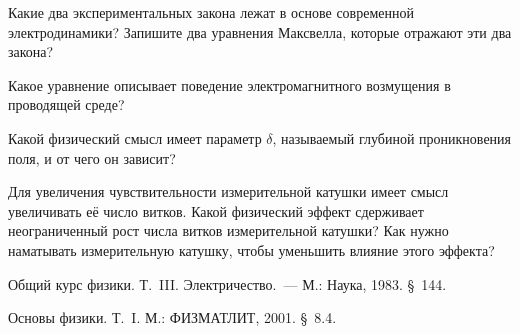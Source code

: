 {\small

\kv

\n Какие два экспериментальных закона лежат в основе современной электродинамики? Запишите два уравнения Максвелла,
которые отражают эти два закона?

\n Какое уравнение описывает поведение электромагнитного возмущения в проводящей среде?

\n Какой физический смысл имеет параметр $\delta$, называемый глубиной проникновения поля, и от чего он зависит?

\n Для увеличения чувствительности измерительной катушки имеет смысл увеличивать её число витков. Какой физический
эффект сдерживает неограниченный рост числа витков измерительной катушки? Как нужно наматывать измерительную катушку,
чтобы уменьшить влияние этого эффекта?

\bv

\lit

 Общий курс физики. Т.~III. Электричество.~--- М.: Наука, 1983. \S~144.

 Основы физики. Т.~I. М.: ФИЗМАТЛИТ, 2001. \S~8.4.

}
